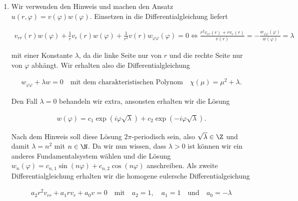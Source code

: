 
\begin{solution}

\phantom{}

\begin{enumerate}[label = (\roman*)]

    \item Wir verwenden den Hinweis und machen den Ansatz $u(r, \varphi) = v(\varphi) w(\varphi)$. Einsetzen in die Differentialgleichung liefert

    \begin{align*}
    v_{rr}(r)w(\varphi) + \frac{1}{r} v_r(r)w(\varphi) + \frac{1}{r^2} v(r)w_{\varphi\varphi}(\varphi) = 0 \Leftrightarrow \frac{r^2v_{rr}(r) + rv_r(r)}{v(r)} = -\frac{w_{\varphi\varphi}(\varphi)}{w(\varphi)} = \lambda
    \end{align*}
    
    mit einer Konstante $\lambda$, da die linke Seite nur von $r$ und die rechte Seite nur von $\varphi$ abhängt. Wir erhalten also die Differentialgleichung 
    
    \begin{align*}
        w_{\varphi\varphi} + \lambda w = 0 \quad \text{mit dem charakteristischen Polynom} \quad \chi(\mu) = \mu^2 + \lambda.
    \end{align*}
    
    Den Fall $\lambda = 0$ behandeln wir extra, ansonsten erhalten wir die Lösung 
    
    \begin{align*}
        w(\varphi) = c_1 \exp\left(i \varphi \sqrt{\lambda} \right) + c_2 \exp\left(-i \varphi \sqrt{\lambda} \right).
    \end{align*}

    Nach dem Hinweis soll diese Lösung $2\pi$-periodisch sein, also $\sqrt{\lambda} \in \Z$ und damit $\lambda = n^2$ mit $n \in \N$. Da wir nun wissen, dass $\lambda > 0$ ist können wir ein anderes Fundamentalsystem wählen und die Lösung $w_n(\varphi) = c_{n,1} \sin(n\varphi) + c_{n,2} \cos(n\varphi)$ anschreiben.    
    Als zweite Differentialgleichung erhalten wir die homogene eulersche Differentialgeichung 

    \begin{align*}
        a_2 r^2 v_{rr} + a_1 r v_r + a_0 v = 0 \quad \text{mit} \quad a_2 = 1, \quad a_1 = 1 \quad \text{und} \quad a_0 = -\lambda
    \end{align*}


\end{enumerate}
\end{solution}
